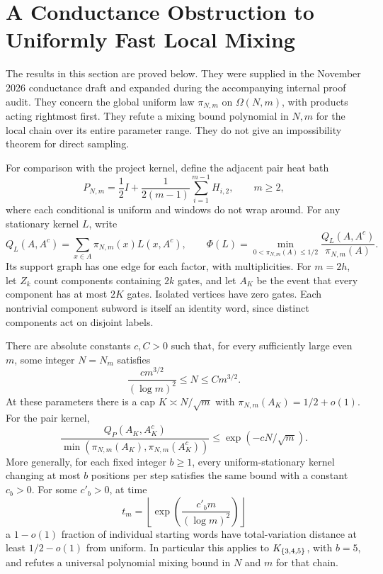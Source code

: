 \section{A Conductance Obstruction to Uniformly Fast Local Mixing}
\label{sec:conductance-obstruction}

The results in this section are proved below.  They were supplied in the
November 2026 conductance draft and expanded during the accompanying internal
proof audit.  They concern the global uniform law $\pi_{N,m}$ on
$\Omega(N,m)$, with products acting rightmost first.  They refute a mixing
bound polynomial in $N,m$ for the local chain over its entire parameter
range.  They do not give an impossibility theorem for direct sampling.

For comparison with the project kernel, define the adjacent pair heat bath
\[
 P_{N,m}=\frac12 I+
 \frac1{2(m-1)}\sum_{i=1}^{m-1}H_{i,2},\qquad m\ge2,
\]
where each conditional is uniform and windows do not wrap around.
For any stationary kernel $L$, write
\[
 Q_L(A,A^c)=\sum_{x\in A}\pi_{N,m}(x)L(x,A^c),\qquad
 \Phi(L)=\min_{0<\pi_{N,m}(A)\le1/2}
       \frac{Q_L(A,A^c)}{\pi_{N,m}(A)}.
\]
Its support graph has one edge for each factor, with multiplicities.
For $m=2h$, let $Z_k$ count components containing $2k$ gates, and let
$A_K$ be the event that every component has at most $2K$ gates.
Isolated vertices have zero gates.  Each nontrivial component subword is
itself an identity word, since distinct components act on disjoint labels.

\begin{theorem}
\label{thm:balanced-bottleneck}
There are absolute constants $c,C>0$ such that, for every sufficiently large
even $m$, some integer $N=N_m$ satisfies
\[
 \frac{c m^{3/2}}{(\log m)^2}\le N\le C m^{3/2}.
\]
At these parameters there is a cap $K\asymp N/\sqrt m$ with
$\pi_{N,m}(A_K)=1/2+o(1)$.  For the pair kernel,
\[
 \frac{Q_P(A_K,A_K^c)}{\min(\pi_{N,m}(A_K),\pi_{N,m}(A_K^c))}
 \le \exp(-cN/\sqrt m).
\]
More generally, for each fixed integer $b\ge1$, every uniform-stationary
kernel changing at most $b$ positions per step satisfies the same bound
with a constant $c_b>0$.  For some $c'_b>0$, at time
\[
 t_m=\left\lfloor\exp\!\left(\frac{c'_b m}{(\log m)^2}\right)\right\rfloor
\]
a $1-o(1)$ fraction of individual starting words have total-variation
distance at least $1/2-o(1)$ from uniform.  In particular this applies to
$K_{\{3,4,5\}}$, with $b=5$, and refutes a universal polynomial mixing bound in
$N$ and $m$ for that chain.
\end{theorem}


